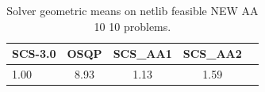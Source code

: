 \begin{table}
\centering
\caption{Solver geometric means on netlib feasible NEW AA 10 10 problems.}
\label{t-netlib feasible NEW AA 10 10-geom_mean}
\begin{tabular}{lcccc}
\toprule
 SCS-3.0 &  OSQP &  SCS\_AA1 &  SCS\_AA2 \\
\midrule
    1.00 &  8.93 &     1.13 &     1.59 \\
\bottomrule
\end{tabular}
\end{table}
